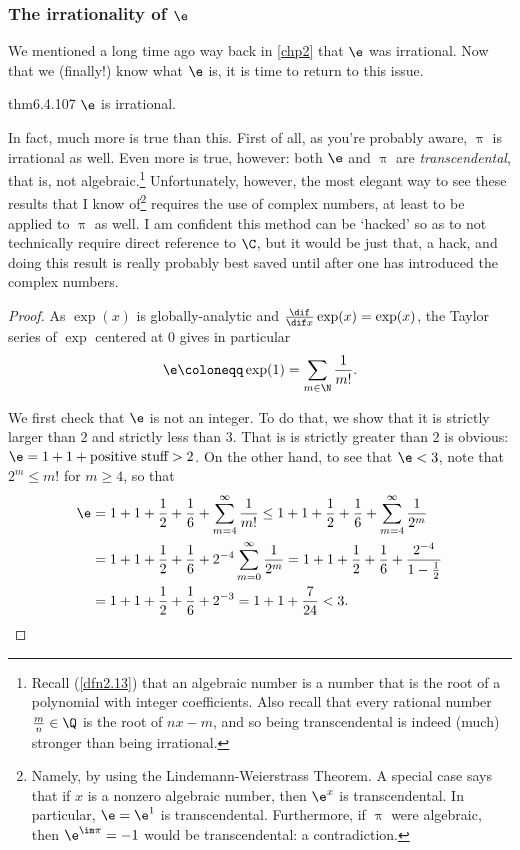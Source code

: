 \subsubsection{The irrationality of \texorpdfstring{$\e$}{e}}

We mentioned a long time ago way back in \cref{chp2} that $\e$ was irrational.  Now that we (finally!) know what $\e$ is, it is time to return to this issue.
\begin{thm}{}{thm6.4.107}
$\e$ is irrational.
\begin{rmk}
In fact, much more is true than this.  First of all, as you're probably aware, $\uppi$ is irrational as well.  Even more is true, however:  both $\e$ and $\uppi$ are \emph{transcendental}, that is, not algebraic.\footnote{Recall (\cref{dfn2.13}) that an algebraic number is a number that is the root of a polynomial with integer coefficients.  Also recall that every rational number $\frac{m}{n}\in \Q$ is the root of $nx-m$, and so being transcendental is indeed (much) stronger than being irrational.}  Unfortunately, however, the most elegant way to see these results that I know of\footnote{Namely, by using the Lindemann-Weierstrass Theorem.  A special case says that if $x$ is a nonzero algebraic number, then $\e ^x$ is transcendental.  In particular, $\e =\e ^1$ is transcendental.  Furthermore, if $\uppi$ were algebraic, then $\e ^{\im \pi}=-1$ would be transcendental:  a contradiction.} requires the use of complex numbers, at least to be applied to $\uppi$ as well.  I am confident this method can be `hacked' so as to not technically require direct reference to $\C$, but it would be just that, a hack, and doing this result is really probably best saved until after one has introduced the complex numbers.
\end{rmk}
\begin{proof}
As $\exp (x)$ is globally-analytic and $\frac{\dif}{\dif x}\exp (x)=\exp (x)$, the Taylor series of $\exp$ centered at $0$ gives in particular
\begin{equation}
\e \coloneqq \exp (1)=\sum _{m\in \N}\frac{1}{m!}.
\end{equation}

We first check that $\e$ is not an integer.  To do that, we show that it is strictly larger than $2$ and strictly less than $3$.  That is is strictly greater than $2$ is obvious:  $\e =1+1+\text{positive stuff}>2$.  On the other hand, to see that $\e <3$, note that $2^m\leq m!$ for $m\geq 4$, so that
\begin{equation}
\begin{split}
\e & =1+1+\frac{1}{2}+\frac{1}{6}+\sum _{m=4}^{\infty}\frac{1}{m!}\leq 1+1+\frac{1}{2}+\frac{1}{6}+\sum _{m=4}^{\infty}\frac{1}{2^m}\\
& =1+1+\frac{1}{2}+\frac{1}{6}+2^{-4}\sum _{m=0}^{\infty}\frac{1}{2^m}=1+1+\frac{1}{2}+\frac{1}{6}+\frac{2^{-4}}{1-\tfrac{1}{2}} \\
& =1+1+\frac{1}{2}+\frac{1}{6}+2^{-3}=1+1+\frac{7}{24}<3.
\end{split}
\end{equation}


\end{proof}
\end{thm}

